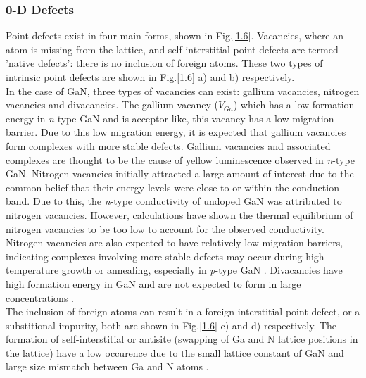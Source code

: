 \subsubsection{0-D Defects}
Point defects exist in four main forms, shown in Fig.\ref{1.6}. Vacancies, where an atom is missing from the lattice, and self-interstitial point defects are termed 'native defects': there is no inclusion of foreign atoms. These two types of intrinsic point defects are shown in Fig.\ref{1.6} a) and b) respectively.\\ 
In the case of GaN, three types of vacancies can exist: gallium vacancies, nitrogen vacancies and divacancies. The gallium vacancy ($V_{Ga}$) which has a low formation energy in {\it n}-type GaN and is acceptor-like, this vacancy has a low migration barrier. Due to this low migration energy, it is expected that gallium vacancies form complexes with more stable defects. Gallium vacancies and associated complexes are thought to be the cause of yellow luminescence observed in {\it n}-type GaN. Nitrogen vacancies initially attracted a large amount of interest due to the common belief that their energy levels were close to or within the conduction band. Due to this, the {\it n}-type conductivity of undoped GaN was attributed to nitrogen vacancies.  However, calculations have shown the thermal equilibrium of nitrogen vacancies to be too low to account for the observed conductivity. Nitrogen vacancies are also expected to have relatively low migration barriers, indicating complexes involving more stable defects may occur during high-temperature growth or annealing, especially in {\it p}-type GaN \cite{Reshchikov2005}. Divacancies have high formation energy in GaN and are not expected to form in large concentrations \cite{Reshchikov2005}.
\\The inclusion of foreign atoms can result in a foreign interstitial point defect, or a substitional impurity, both are shown in Fig.\ref{1.6} c) and d) respectively. The formation of self-interstitial or antisite (swapping of Ga and N lattice positions in the lattice) have a low occurence due to the small lattice constant of GaN and large size mismatch between Ga and N atoms \cite{Reshchikov2005}.
